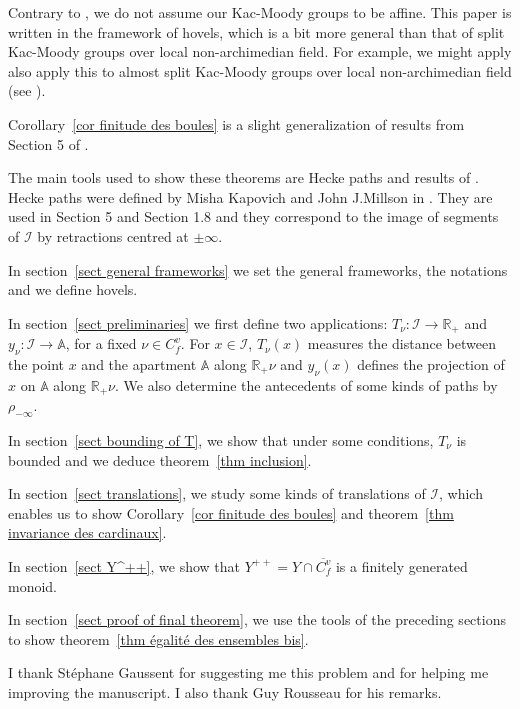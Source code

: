 \documentclass[12pt]{article}
\theoremstyle{plain}
\theoremstyle{definition}
\newcommand{\R}{\mathbb{R}}
\newcommand{\A}{\mathbb{A}}
\newcommand{\I}{\mathcal{I}}
\begin{document}
Contrary to \cite{braverman2014affine}, we do not assume our Kac-Moody groups to be affine. This paper is written in the framework of hovels, which is a bit more general than that of split Kac-Moody groups over local non-archimedian field. For example, we might apply also apply this to almost split Kac-Moody groups over local non-archimedian field (see \cite{rousseau2012almost}).

Corollary~\ref{cor finitude des boules} is a slight generalization of results from Section 5 of \cite{gaussent2014spherical}.


\vspace{3mm}


The main tools used to show these theorems are Hecke paths and results of \cite{gaussent2014spherical}. Hecke paths were defined by Misha Kapovich and John J.Millson in \cite{MR2415306}. They are used in \cite{gaussent2008kac} Section 5 and \cite{gaussent2014spherical} Section 1.8 and they correspond to the image of segments of $\mathcal{I}$ by retractions centred at $\pm\infty$.

In section~\ref{sect general frameworks} we set the general frameworks, the notations and we define hovels.

 In section~\ref{sect preliminaries} we first define two applications: $T_\nu:\I\rightarrow\R_+$ and $y_\nu:\I\rightarrow \A$, for a fixed $\nu\in C_f^v$. For $x\in\I$, $T_\nu(x)$ measures the distance between the point $x$ and the apartment $\A$ along $\R_+\nu$ and $y_\nu(x)$ defines the projection of $x$ on $\A$ along $\R_+\nu$. We also determine the antecedents of some kinds of paths by $\rho_{-\infty}$. 
 
 In section~\ref{sect bounding of T}, we show that under some conditions, $T_\nu$ is bounded and we deduce theorem~\ref{thm inclusion}. 
 
 In section~\ref{sect translations}, we study some kinds of translations of $\I$, which enables us to show Corollary~\ref{cor finitude des boules} and theorem~\ref{thm invariance des cardinaux}.
 
 In section~\ref{sect Y^++}, we show that $Y^{++}=Y\cap \overline{C_f^v}$ is a finitely generated monoid.
 
 In section~\ref{sect proof of final theorem}, we use the tools of the preceding sections to show theorem~\ref{thm égalité des ensembles bis}. 

\vspace{3mm}

I thank Stéphane Gaussent for suggesting me this problem and for helping me improving the manuscript. I also thank Guy Rousseau for his remarks.
\end{document}
